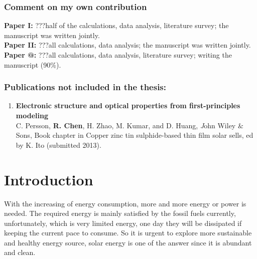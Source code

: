 \documentclass[a4paper, 12pt, titlepage,oneside,drop]{kthesis}
\makeatletter
\newcommand{\Rmnum}[1]{\expandafter\@slowromancap\romannumeral #1@}
\makeatother
\begin{document}
\subsection*{Comment on my own contribution}

\textbf{Paper I:} ???half of the calculations, data analysis, literature survey;
the manuscript was written jointly.\\
\textbf{Paper II:} ???all calculations, data analysis; the manuscript was
written jointly.\\
\textbf{Paper \Rmnum{3}:} ???all calculations, data analysis, literature survey;
writing the manuscript (90\%).\\

\subsection*{Publications not included in the thesis:}
\begin{enumerate}
\renewcommand{\labelenumi}{\Roman{enumi}}
\setcounter{enumi}{3}

\item{}\textbf{Electronic structure and optical properties from first-principles modeling}
\\C. Persson, \textbf{R. Chen}, H. Zhao, M. Kumar, and D. Huang, {\textit John Wiley $\&$ Sons}, {Book chapter in Copper zinc tin sulphide-based thin film solar sells, ed by K. Ito} (submitted 2013).


\end{enumerate}

\newpage
\setcounter{page}{7}
\setcounter{secnumdepth}{3}
\setcounter{tocdepth}{3}
\tableofcontents







\newpage
{}
\chapter{Introduction}%



With the increasing of energy consumption, more and more energy or power is needed. The required energy is mainly satisfied by the fossil fuels currently, unfortunately,
which is very limited energy, one day they will be dissipated if keeping the current pace to consume. So it is urgent to explore more sustainable and healthy
energy source, solar energy is one of the answer since it is abundant and clean. 
\end{document}
